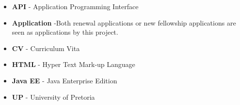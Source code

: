 \documentclass[12pt]{article}
\begin{document}
\begin{itemize}

\item \textbf{API} - Application Programming Interface
\item \textbf{Application} -Both renewal applications or new fellowship applications are seen as applications by this project.
\item \textbf{CV} - Curriculum Vita
\item \textbf{HTML} - Hyper Text Mark-up Language
\item \textbf{Java EE} - Java Enterprise Edition
\item \textbf{UP} - University of Pretoria
 
\end{itemize}	
\end{document}
